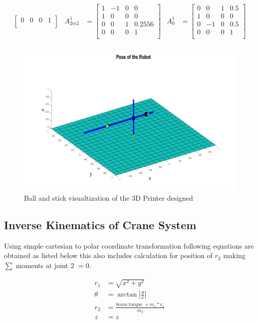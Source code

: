 \documentclass{UoNMCHA}
\numberwithin{equation}{section}
\begin{document}
\begin{align*}
\begin{bmatrix}
	0 & 0 & 0 & 1\\
	\end{bmatrix} & 		
	A_{2m2}^1 &= 
	\begin{bmatrix}
	1 & -1 & 0 & 0 \\
	1 & 0 & 0 & 0\\
	0 & 0 & 1 & 0.2556\\
	0 & 0 & 0 & 1\\
	\end{bmatrix} &	
	A_0^1 &= 
	\begin{bmatrix}
	0 & 0 & 1 & 0.5 \\
	1 & 0 & 0 & 0\\
	0 & -1 & 0 & 0.5\\
	0 & 0 & 0 & 1\\
	\end{bmatrix} \\
	\end{align*}
	
	\begin{figure}[H]
		\begin{center}
			\includegraphics[width=.8\linewidth]{figs/Picture8}
			\caption{Ball and stick visualtization of the 3D Printer designed}
			\label{figs/Picture8}
		\end{center}
	\end{figure}
	
	\newpage
	\subsection{Inverse Kinematics of Crane System}
	
	Using simple cartesian to polar coordinate transformation following equations are obtained as listed
	below this also includes calculation for position of $r_{2}$ making $\sum$ moments at joint 2 $=0$.
	
	\begin{align}
	r_{1} & =\sqrt{x^{2}+y^{2}} \\ 
	\theta & =\arctan \left|\frac{y}{x}\right| \\
	r_{2} &=\frac{b e a m \operatorname{torque}+m_{1} * r_{1}}{m_{2}} \\ 
	z & =z 
	\end{align}
	
\end{document}

